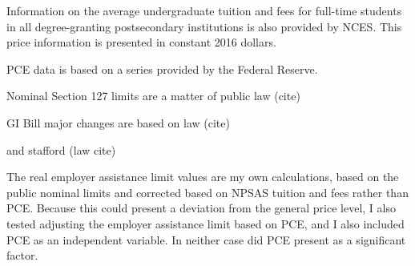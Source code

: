 \documentclass[review]{elsarticle}
\begin{document}
    Information on the average undergraduate tuition and fees for full-time students in all degree-granting postsecondary institutions
    is also provided by NCES\cite{nces_2017}.
    This price information is presented in constant 2016 dollars.

    PCE data is based on a series provided by the Federal Reserve.


    Nominal Section 127 limits are a matter of public law (cite)

    GI Bill major changes are based on law (cite)


    and stafford (law cite)
    

    The real employer assistance limit values are my own calculations,
    based on the public nominal limits and corrected based on NPSAS tuition and fees rather than PCE.
    Because this could present a deviation from the general price level, I also tested adjusting the employer assistance limit based on PCE,
    and I also included PCE as an independent variable. In neither case did PCE present as a significant factor.

\end{document}
